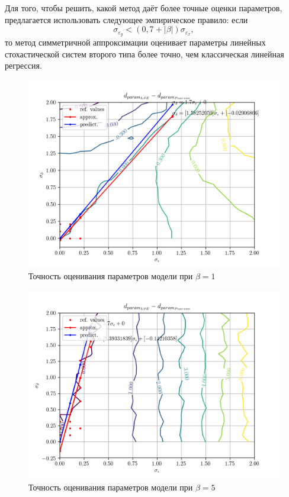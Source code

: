 Для того, чтобы решить, какой метод даёт более точные оценки параметров,
предлагается использовать следующее эмпирическое правило: если
\begin{equation*}
  \sigma_{\varepsilon_y} < (0{,}7 + |\beta|) \sigma_{\varepsilon_x},
\end{equation*}
то метод симметричной аппроксимации оценивает параметры линейных стохастической систем
второго типа более точно, чем классическая линейная регрессия.

\begin{figure}[h]
  \centering
  \includegraphics[width=150mm]{fig/linear/param/beta-1_param-accs-diff-approx.png}
  \caption{Точность оценивания параметров модели при \( \beta = 1\)}\label{fig:comparison_linear_params_1}
\end{figure}

\begin{figure}[h]
  \centering
  \includegraphics[width=150mm]{fig/linear/param/beta-5_param-accs-diff-approx.png}
  \caption{Точность оценивания параметров модели при \( \beta = 5\)}\label{fig:comparison_linear_params_2}
\end{figure}

